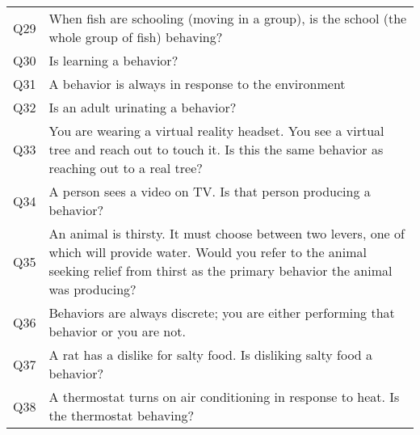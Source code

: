 \begin{tabular}{ll}
Q29                   &                                                                                                             When fish are schooling (moving in a group), is the school (the whole group of fish) behaving? \\
Q30                   &                                                                                                                                                                                    Is learning a behavior? \\
Q31                   &                                                                                                                                                        A behavior is always in response to the environment \\
Q32                   &                                                                                                                                                                          Is an adult urinating a behavior? \\
Q33                   &                                                     You are wearing a virtual reality headset. You see a virtual tree and reach out to touch it. Is this the same behavior as reaching out to a real tree? \\
Q34                   &                                                                                                                                          A person sees a video on TV. Is that person producing a behavior? \\
Q35                   &       An animal is thirsty. It must choose between two levers, one of which will provide water. Would you refer to the animal seeking relief from thirst as the primary behavior the animal was producing? \\
Q36                   &                                                                                                                     Behaviors are always discrete; you are either performing that behavior or you are not. \\
Q37                   &                                                                                                                                    A rat has a dislike for salty food. Is disliking salty food a behavior? \\
Q38                   &                                                                                                                    A thermostat turns on air conditioning in response to heat. Is the thermostat behaving? \\

\end{tabular}
